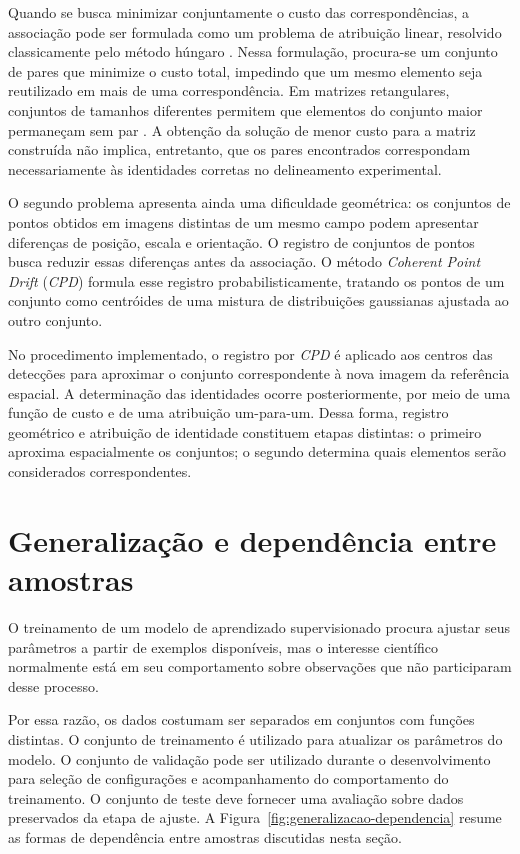 Quando se busca minimizar conjuntamente o custo das correspond\^encias, a associa\c{c}\~ao pode ser formulada como um problema de atribui\c{c}\~ao linear, resolvido classicamente pelo m\'etodo h\'ungaro \citep{kuhn1955}. Nessa formula\c{c}\~ao, procura-se um conjunto de pares que minimize o custo total, impedindo que um mesmo elemento seja reutilizado em mais de uma correspond\^encia. Em matrizes retangulares, conjuntos de tamanhos diferentes permitem que elementos do conjunto maior permane\c{c}am sem par \citep{scipy}. A obten\c{c}\~ao da solu\c{c}\~ao de menor custo para a matriz constru\'ida n\~ao implica, entretanto, que os pares encontrados correspondam necessariamente \`as identidades corretas no delineamento experimental.

O segundo problema apresenta ainda uma dificuldade geom\'etrica: os conjuntos de pontos obtidos em imagens distintas de um mesmo campo podem apresentar diferen\c{c}as de posi\c{c}\~ao, escala e orienta\c{c}\~ao. O registro de conjuntos de pontos busca reduzir essas diferen\c{c}as antes da associa\c{c}\~ao. O m\'etodo \textit{Coherent Point Drift} (\textit{CPD}) \citep{myronenko2010} formula esse registro probabilisticamente, tratando os pontos de um conjunto como centr\'oides de uma mistura de distribui\c{c}\~oes gaussianas ajustada ao outro conjunto.

No procedimento implementado, o registro por \textit{CPD} \'e aplicado aos centros das detec\c{c}\~oes para aproximar o conjunto correspondente \`a nova imagem da refer\^encia espacial. A determina\c{c}\~ao das identidades ocorre posteriormente, por meio de uma fun\c{c}\~ao de custo e de uma atribui\c{c}\~ao um-para-um. Dessa forma, registro geom\'etrico e atribui\c{c}\~ao de identidade constituem etapas distintas: o primeiro aproxima espacialmente os conjuntos; o segundo determina quais elementos ser\~ao considerados correspondentes.

\section{Generaliza\c{c}\~ao e depend\^encia entre amostras}
\label{sec:generalizacao-dependencia}

O treinamento de um modelo de aprendizado supervisionado procura ajustar seus par\^ametros a partir de exemplos dispon\'iveis, mas o interesse cient\'ifico normalmente est\'a em seu comportamento sobre observa\c{c}\~oes que n\~ao participaram desse processo.

Por essa raz\~ao, os dados costumam ser separados em conjuntos com fun\c{c}\~oes distintas. O conjunto de treinamento \'e utilizado para atualizar os par\^ametros do modelo. O conjunto de valida\c{c}\~ao pode ser utilizado durante o desenvolvimento para sele\c{c}\~ao de configura\c{c}\~oes e acompanhamento do comportamento do treinamento. O conjunto de teste deve fornecer uma avalia\c{c}\~ao sobre dados preservados da etapa de ajuste. A Figura~\ref{fig:generalizacao-dependencia} resume as formas de depend\^encia entre amostras discutidas nesta se\c{c}\~ao.

